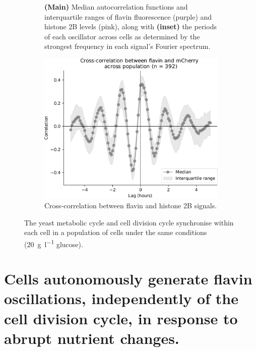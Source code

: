\begin{figure}
\begin{subfigure}[htpb]{0.4\textwidth}
   \caption{
     \textbf{(Main)} Median autocorrelation functions and interquartile ranges of flavin fluorescence (purple) and histone 2B levels (pink), %
     along with \textbf{(inset)} the periods of each oscillator across cells as determined by the strongest frequency in each signal's Fourier spectrum.
   }
   \label{fig:biology-highglc-sync-acf}
  \end{subfigure}

  \begin{subfigure}[htpb]{0.4\textwidth}
   \centering
   \includegraphics[width=\textwidth]{xcf_edit.pdf}
   \caption{
    Cross-correlation between flavin and histone 2B signals.%
   }
   \label{fig:biology-highglc-sync-xcf}
  \end{subfigure}

  \caption{
    The yeast metabolic cycle and cell division cycle synchronise within each cell in a population of cells under the same conditions (\SI{20}{\gram~\litre^{-1}} glucose).
  }
  \label{fig:biology-highglc-sync}
\end{figure}


\section[Abrupt nutrient changes]{Cells autonomously generate flavin oscillations, independently of the cell division cycle, in response to abrupt nutrient changes.}
\label{sec:biology-abrupt}

